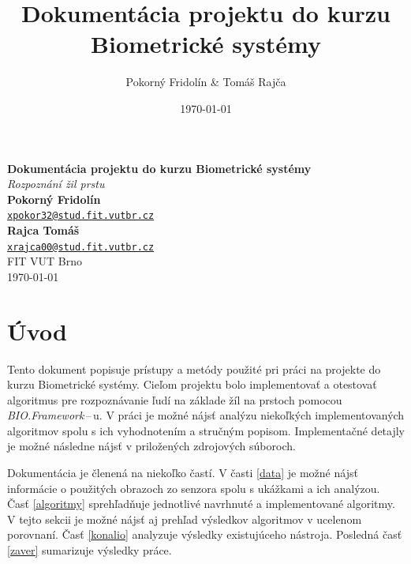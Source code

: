 \documentclass[11pt,a4paper]{article}
\begin{document}
\title{Dokumentácia projektu do kurzu Biometrické systémy}
\author{Pokorný Fridolín \& Tomáš Rajča}
\date{\today}

\vspace*{\fill}
\begin{center}
\textbf{\Huge\textbf{Dokumentácia projektu do kurzu Biometrické systémy}} \\
\vspace{8mm}
\textit{\Large\color{gray} Rozpoznání žil prstu}\\
\vspace*{\fill}
\vspace*{\fill}
\hfill\textbf{Pokorný Fridolín} \\
\hfill{\href{mailto:xpokor32@stud.fit.vutbr.cz}{\nolinkurl{xpokor32@stud.fit.vutbr.cz}}} \\
\hfill\textbf{Rajca Tomáš} \\
\hfill{\href{mailto:xrajca00@stud.fit.vutbr.cz}{\nolinkurl{xrajca00@stud.fit.vutbr.cz}}} \\
\hfill{FIT VUT Brno} \\
\hfill\today
\end{center}
\vspace*{\fill}

\renewcommand{\baselinestretch}{1.5}
\thispagestyle{empty}
\clearpage

\setcounter{page}{1}
\clearpage

\section{Úvod} \label{uvod}

Tento dokument popisuje prístupy a metódy použité pri práci na projekte do kurzu
Biometrické systémy. Cieľom projektu bolo implementovať a otestovať algoritmus
pre rozpoznávanie ľudí na základe žíl na prstoch pomocou
\emph{BIO.Framework}\,--\,u. V práci je možné nájsť analýzu niekoľkých
implementovaných algoritmov spolu s ich vyhodnotením a stručným popisom.
Implementačné detajly je možné následne nájsť v priložených zdrojových súboroch.

Dokumentácia je členená na niekoľko častí. V časti \ref{data} je možné nájsť
informácie o použitých obrazoch zo senzora spolu s ukážkami a ich analýzou. Časť
\ref{algoritmy} sprehľadňuje jednotlivé navrhnuté a implementované algoritmy.
V tejto sekcii je možné nájsť aj prehľad výsledkov algoritmov v ucelenom
porovnaní. Časť \ref{konalio} analyzuje výsledky existujúceho nástroja. Posledná
časť \ref{zaver} sumarizuje výsledky práce.
\end{document}
